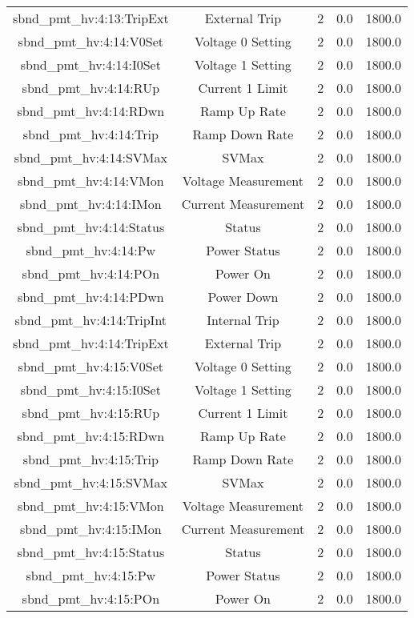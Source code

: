 \begin{table}[ptb]
\begin{tabular}{c | c c c c}
sbnd_pmt_hv:4:13:TripExt & External Trip & 2 & 0.0 & 1800.0\\ 
sbnd_pmt_hv:4:14:V0Set & Voltage 0 Setting & 2 & 0.0 & 1800.0\\ 
sbnd_pmt_hv:4:14:I0Set & Voltage 1 Setting & 2 & 0.0 & 1800.0\\ 
sbnd_pmt_hv:4:14:RUp & Current 1 Limit & 2 & 0.0 & 1800.0\\ 
sbnd_pmt_hv:4:14:RDwn & Ramp Up Rate & 2 & 0.0 & 1800.0\\ 
sbnd_pmt_hv:4:14:Trip & Ramp Down Rate & 2 & 0.0 & 1800.0\\ 
sbnd_pmt_hv:4:14:SVMax & SVMax & 2 & 0.0 & 1800.0\\ 
sbnd_pmt_hv:4:14:VMon & Voltage Measurement & 2 & 0.0 & 1800.0\\ 
sbnd_pmt_hv:4:14:IMon & Current Measurement & 2 & 0.0 & 1800.0\\ 
sbnd_pmt_hv:4:14:Status & Status & 2 & 0.0 & 1800.0\\ 
sbnd_pmt_hv:4:14:Pw & Power Status & 2 & 0.0 & 1800.0\\ 
sbnd_pmt_hv:4:14:POn & Power On & 2 & 0.0 & 1800.0\\ 
sbnd_pmt_hv:4:14:PDwn & Power Down & 2 & 0.0 & 1800.0\\ 
sbnd_pmt_hv:4:14:TripInt & Internal Trip & 2 & 0.0 & 1800.0\\ 
sbnd_pmt_hv:4:14:TripExt & External Trip & 2 & 0.0 & 1800.0\\ 
sbnd_pmt_hv:4:15:V0Set & Voltage 0 Setting & 2 & 0.0 & 1800.0\\ 
sbnd_pmt_hv:4:15:I0Set & Voltage 1 Setting & 2 & 0.0 & 1800.0\\ 
sbnd_pmt_hv:4:15:RUp & Current 1 Limit & 2 & 0.0 & 1800.0\\ 
sbnd_pmt_hv:4:15:RDwn & Ramp Up Rate & 2 & 0.0 & 1800.0\\ 
sbnd_pmt_hv:4:15:Trip & Ramp Down Rate & 2 & 0.0 & 1800.0\\ 
sbnd_pmt_hv:4:15:SVMax & SVMax & 2 & 0.0 & 1800.0\\ 
sbnd_pmt_hv:4:15:VMon & Voltage Measurement & 2 & 0.0 & 1800.0\\ 
sbnd_pmt_hv:4:15:IMon & Current Measurement & 2 & 0.0 & 1800.0\\ 
sbnd_pmt_hv:4:15:Status & Status & 2 & 0.0 & 1800.0\\ 
sbnd_pmt_hv:4:15:Pw & Power Status & 2 & 0.0 & 1800.0\\ 
sbnd_pmt_hv:4:15:POn & Power On & 2 & 0.0 & 1800.0\\ 

\end{tabular}
\end{table}
